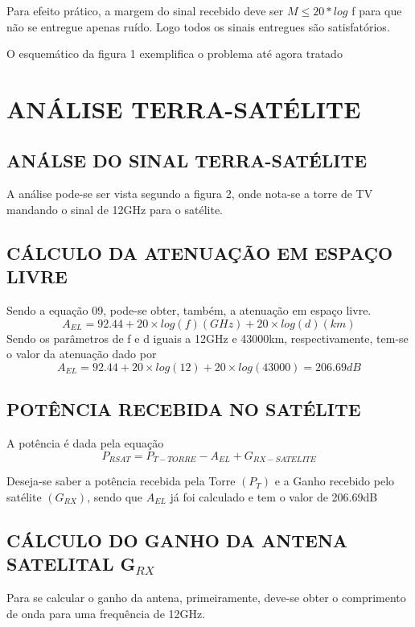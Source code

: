 \documentclass[a4paper,12pt]{article}
\begin{document}
Para efeito prático, a margem do sinal recebido deve ser $M \leq 20*log$ f para que não
se entregue apenas ruído. Logo todos os sinais entregues são satisfatórios.

O esquemático da figura 1 exemplifica o problema até agora tratado

\section{ANÁLISE TERRA-SATÉLITE}
\subsection{ANÁLSE DO SINAL TERRA-SATÉLITE}
A análise pode-se ser vista segundo a figura 2, onde nota-se a torre de TV
mandando o sinal de 12GHz para o satélite.
\subsection{CÁLCULO DA ATENUAÇÃO EM ESPAÇO LIVRE}
Sendo a equação 09, pode-se obter, também, a atenuação em espaço livre. 
\begin{equation}
 A_{EL} = 92.44 + 20 \times log(f)(GHz) + 20 \times log(d)(km)
\end{equation}
Sendo os parâmetros de f e d iguais a 12GHz e 43000km, respectivamente, tem-se
o valor da atenuação dado por
\begin{equation}
 A_{EL} = 92.44 + 20 \times log(12) + 20 \times log(43000) = 206.69dB
\end{equation}

\subsection{POTÊNCIA RECEBIDA NO SATÉLITE}
A potência é dada pela equação
\begin{equation}
 P_{RSAT} = P_{T-TORRE} - A_{EL} + G_{RX-SATELITE}
 \end{equation}

Deseja-se saber a potência recebida pela Torre $(P_T)$ e a Ganho recebido pelo
satélite $(G_{RX})$, sendo que $A_{EL}$ já foi calculado e tem o valor de 206.69dB

\subsection{CÁLCULO DO GANHO DA ANTENA SATELITAL G$_{RX}$}
Para se calcular o ganho da antena, primeiramente, deve-se obter o
comprimento de onda para uma frequência de 12GHz.
\end{document}
